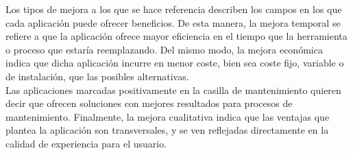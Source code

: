 Los tipos de mejora a los que se hace referencia describen los campos en los que cada
aplicación puede ofrecer beneficios. De esta manera, la mejora temporal se refiere a que la
aplicación ofrece mayor eficiencia en el tiempo que la herramienta o proceso que estaría
reemplazando. Del mismo modo, la mejora económica indica que dicha aplicación incurre
en menor coste, bien sea coste fijo, variable o de instalación, que las posibles alternativas.\\

Las aplicaciones marcadas positivamente en la casilla de mantenimiento quieren decir que
ofrecen soluciones con mejores resultados para procesos de mantenimiento. Finalmente, la
mejora cualitativa indica que las ventajas que plantea la aplicación son transversales, y se
ven reflejadas directamente en la calidad de experiencia para el usuario.
